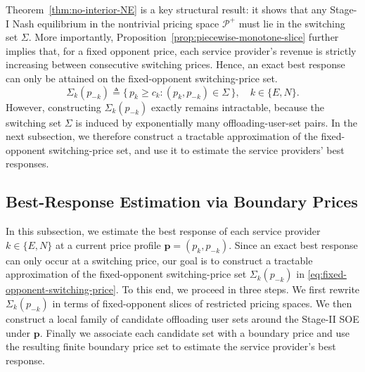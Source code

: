 \documentclass[lettersize,journal]{IEEEtran}
\begin{document}
Theorem~\ref{thm:no-interior-NE} is a key structural result: it shows that any Stage-I Nash equilibrium in the nontrivial pricing space $\mathcal P^{+}$ must lie in the switching set $\Sigma$. More importantly, Proposition~\ref{prop:piecewise-monotone-slice} further implies that, for a fixed opponent price, each service provider's revenue is strictly increasing between consecutive switching prices. Hence, an exact best response can only be attained on the fixed-opponent switching-price set.
\begin{equation}\label{eq:fixed-opponent-switching-price}
    \Sigma_k(p_{-k}) \triangleq \{\, p_k \ge c_k : (p_k,p_{-k}) \in \Sigma \,\},\quad k\in\{E,N\}.
\end{equation}
However, constructing $\Sigma_k(p_{-k})$ exactly remains intractable, because the switching set $\Sigma$ is induced by exponentially many offloading-user-set pairs. In the next subsection, we therefore construct a tractable approximation of the fixed-opponent switching-price set, and use it to estimate the service providers' best responses.

\subsection{Best-Response Estimation via Boundary Prices}
\label{subsec:br_estimation}

In this subsection, we estimate the best response of each service provider $k\in\{E,N\}$ at a current price profile $\boldsymbol{p}=(p_k,p_{-k})$. Since an exact best response can only occur at a switching price, our goal is to construct a tractable approximation of the fixed-opponent switching-price set $\Sigma_k(p_{-k})$ in \eqref{eq:fixed-opponent-switching-price}. To this end, we proceed in three steps. We first rewrite $\Sigma_k(p_{-k})$ in terms of fixed-opponent slices of restricted pricing spaces. We then construct a local family of candidate offloading user sets around the Stage-II SOE under $\boldsymbol{p}$. Finally we associate each candidate set with a boundary price and use the resulting finite boundary price set to estimate the service provider's best response.
\end{document}
